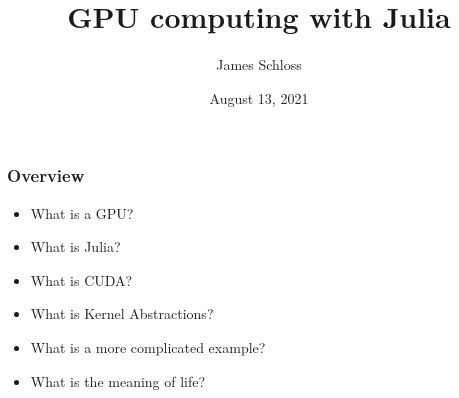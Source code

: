 \documentclass{beamer}
\title[OIST Mini-course]{GPU computing with Julia} %
\author{James Schloss} %
\institute[OIST] %
\date{August 13, 2021} %
\begin{document}

\begin{frame}
\vspace*{1.4cm}
\titlepage %
\end{frame}




\begin{frame}
\frametitle{Overview}

\begin{itemize}
\pause
\item What is a GPU?
\pause
\item What is Julia?
\pause
\item What is CUDA?
\pause
\item What is Kernel Abstractions?
\pause
\item What is a more complicated example?
\pause
\item What is the meaning of life?
\end{itemize}
\end{frame}
\end{document}
